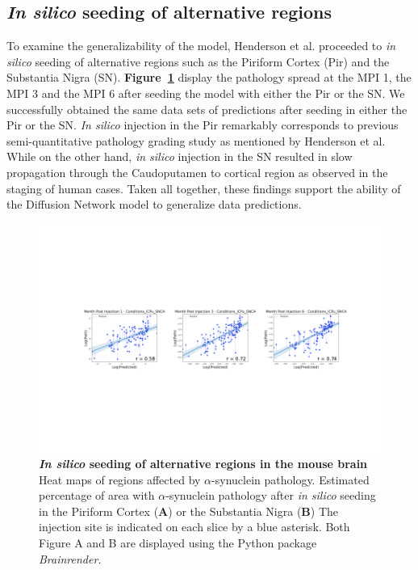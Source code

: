 \subsection{\textit{In silico} seeding of alternative regions}
To examine the generalizability of the model, Henderson et al. proceeded to \textit{in silico} seeding of alternative regions such as the Piriform Cortex (Pir) and the Substantia Nigra (SN). \textbf{Figure~\ref{fig:fig4}} display the pathology spread at the MPI 1, the MPI 3 and the MPI 6 after seeding the model with either the Pir or the SN. We successfully obtained the same data sets of predictions after seeding in either the Pir or the SN. \textit{In silico} injection in the Pir remarkably corresponds to previous semi-quantitative pathology grading study as mentioned by Henderson et al. \cite{Rey_2016} While on the other hand, \textit{in silico} injection in the SN resulted in slow propagation through the Caudoputamen to cortical region as observed in the staging of human cases. Taken all together, these findings support the ability of the Diffusion Network model to generalize data predictions.

\begin{figure}
    
    \includegraphics[width=\linewidth]{Figures/Fig4.pdf}

    \caption{\textbf{\textit{In silico} seeding of alternative regions in the mouse brain} \\
    Heat maps of regions affected by $\alpha$-synuclein pathology.
    Estimated percentage of area with $\alpha$-synuclein pathology after \textit{in silico} seeding in the Piriform Cortex (\textbf{A}) or the Substantia Nigra (\textbf{B}) The injection site is indicated on each slice by a blue asterisk. Both Figure A and B are displayed using the Python package \textit{Brainrender}. \cite{Claudi_2021}}
    \label{fig:fig4}
    \end{figure}
    

